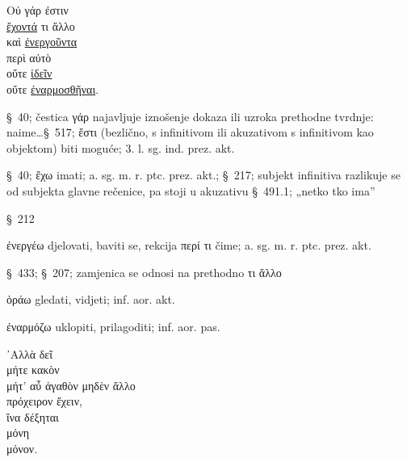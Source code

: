 

{\large
\begin{greek}
\noindent Οὐ γάρ ἐστιν \\
\tabto{2em} \underline{ἔχοντά} τι ἄλλο \\
\tabto{2em} καὶ \underline{ἐνεργοῦντα} \\
\tabto{2em} \tabto{2em} περὶ αὐτὸ \\
\tabto{2em} οὔτε \underline{ἰδεῖν}\\
\tabto{2em} οὔτε \underline{ἐναρμοσθῆναι}.\\

\end{greek}
}

\begin{description}[noitemsep]
\item[γάρ ἐστιν] §~40; čestica γάρ najavljuje iznošenje dokaza ili uzroka prethodne tvrdnje: naime\dots §~517; ἔστι (bezlično, s infinitivom ili akuzativom s infinitivom kao objektom) biti moguće; 3. l. sg. ind. prez. akt.
\item[ἔχοντά τι] §~40; ἔχω imati; a. sg. m. r. ptc. prez. akt.; §~217; subjekt infinitiva razlikuje se od subjekta glavne rečenice, pa stoji u akuzativu §~491.1; „netko tko ima''
\item[ἄλλο] §~212
\item[ἐνεργοῦντα] ἐνεργέω djelovati, baviti se, rekcija περί τι čime; a. sg. m. r. ptc. prez. akt.
\item[περὶ αὐτὸ] §~433; §~207; zamjenica se odnosi na prethodno τι ἄλλο
\item[ἰδεῖν] ὁράω gledati, vidjeti; inf. aor. akt.
\item[ἐναρμοσθῆναι] ἐναρμόζω uklopiti, prilagoditi; inf. aor. pas.

\end{description}



{\large
\begin{greek}
\noindent ᾿Αλλὰ δεῖ \\
\tabto{2em} μήτε κακὸν \\
\tabto{2em} μήτ' αὖ ἀγαθὸν μηδὲν ἄλλο \\
\tabto{2em} πρόχειρον ἔχειν, \\
\tabto{4em} ἵνα δέξηται \\
\tabto{6em} μόνη \\
\tabto{6em} μόνον.\\

\end{greek}
}

